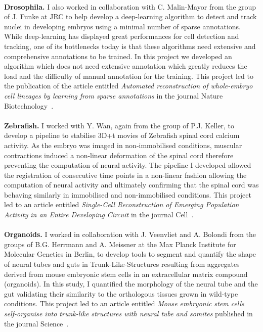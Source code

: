 \paragraph{}\textbf{Drosophila.} I also worked in collaboration with C. Malin-Mayor from the group of J. Funke at JRC to help develop a deep-learning algorithm to detect and track nuclei in developing embryos using a minimal number of sparse annotations.
While deep-learning has displayed great performances for cell detection and tracking, one of its bottlenecks today is that these algorithms need extensive and comprehensive annotations to be trained.
In this project we developed an algorithm which does not need extensive annotation which greatly reduces the load and the difficulty of manual annotation for the training.
This project led to the publication of the article entitled \emph{Automated reconstruction of whole-embryo cell lineages by learning from sparse annotations} in the journal Nature Biotechnology~\cite{Malin-Mayor:2022aa}.
\paragraph{}\textbf{Zebrafish.} I worked with Y. Wan, again from the group of P.J. Keller, to develop a pipeline to stabilise 3D+t movies of Zebrafish spinal cord calcium activity.
As the embryo was imaged in non-immobilised conditions, muscular contractions induced a non-linear deformation of the spinal cord therefore preventing the computation of neural activity.
The pipeline I developed allowed the registration of consecutive time points in a non-linear fashion allowing the computation of neural activity and ultimately confirming that the spinal cord was behaving similarly in immobilised and non-immobilised conditions.
This project led to an article entitled \emph{Single-Cell Reconstruction of Emerging Population Activity in an Entire Developing Circuit} in the journal Cell~\cite{Wan:2019aa}.
\paragraph{}\textbf{Organoids.} I worked in collaboration with J. Veenvliet and A. Bolondi from the groups of B.G. Herrmann and A. Meissner at the Max Planck Institute for Molecular Genetics in Berlin, to develop tools to segment and quantify the shape of neural tubes and guts in Trunk-Like-Structures resulting from aggregates derived from mouse embryonic stem cells in an extracellular matrix compound (organoids).
In this study, I quantified the morphology of the neural tube and the gut validating their similarity to the orthologous tissues grown in wild-type conditions.
This project led to an article entitled \emph{Mouse embryonic stem cells self-organise into trunk-like structures with neural tube and somites} published in the journal Science~\cite{Veenvliet:2020aa}.

